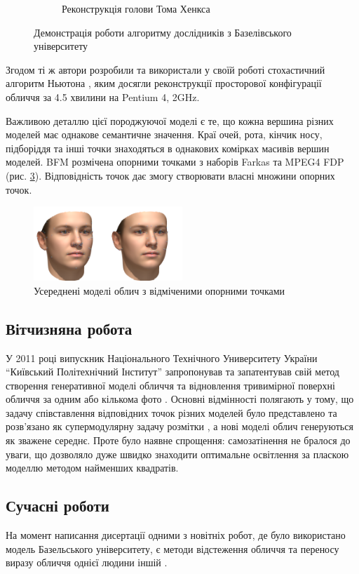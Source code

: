\begin{figure}[h]
\begin{subfigure}[b]{0.3\textwidth}
    \caption{Реконструкція голови Тома Хенкса}
    \label{fig:bfm:tom-hanks}
  \end{subfigure}
  \caption{Демонстрація роботи алгоритму дослідників з Базелівського університету}
\end{figure}

Згодом ті ж автори розробили та використали у своїй роботі
стохастичний алгоритм Ньютона \cite{blanz:vetter:2003},
яким досягли реконструкції просторової конфігурації обличчя за 4.5 хвилини на
Pentium 4, 2GHz.

Важливою деталлю цієї породжуючої моделі є те,
що кожна вершина різних моделей має однакове семантичне значення.
Краї очей, рота, кінчик носу, підборіддя та інші точки
знаходяться в однакових комірках масивів вершин моделей.
BFM розмічена опорними точками з наборів Farkas та MPEG4 FDP
(рис. \ref{fig:problems:feature-points}).
Відповідність точок дає змогу створювати власні множини опорних точок.
\begin{figure}[h]
  \centering
    \includegraphics[width=0.5\textwidth]{images/feature-points}
  \caption{Усереднені моделі облич з відміченими опорними точками}
  \label{fig:problems:feature-points}
\end{figure}

\subsection{Вітчизняна робота}

У 2011 році випускник Національного Технічного Университету України
``Київський Політехнічний Інститут'' запропонував та запатентував
свій метод створення генеративної моделі обличчя та відновлення
тривимірної поверхні обличчя за одним або кількома фото \cite{tyshchenko:2011}.
Основні відмінності полягають у тому,
що задачу співставлення відповідних точок різних моделей
було представлено та розв'язано як супермодулярну задачу розмітки
\cite{Rossi:2006:HCP:1207782},
а нові моделі облич генеруються як зважене середнє.
Проте було наявне спрощення: самозатінення не бралося до уваги,
що дозволяло дуже швидко знаходити оптимальне освітлення
за пласкою моделлю методом найменших квадратів.

\subsection{Сучасні роботи}

На момент написання дисертації одними з новітніх робот,
де було використано модель Базельського університету,
є методи відстеження обличчя \cite{Saito2016}
та переносу виразу обличчя однієї людини іншій \cite{thies2016face}.
